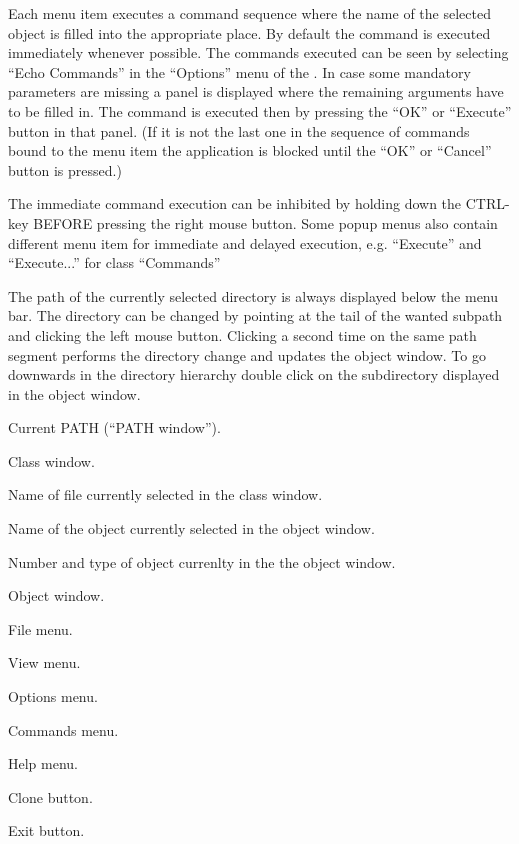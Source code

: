    Each menu item executes a command sequence where the name of the selected
   object is filled into the appropriate place.  By default the command is
   executed immediately whenever possible. The commands executed can be seen
   by selecting ``Echo Commands'' in the ``Options'' menu of the \EW.
   In case some mandatory parameters are missing a panel is displayed
   where the remaining arguments have to be filled in.  The command is
   executed then by pressing the ``OK'' or ``Execute'' button in that panel.
   (If it is not the last one in the sequence of commands bound to the menu item
   the application is blocked until the ``OK'' or ``Cancel'' button is pressed.)

   The immediate command execution can be inhibited by holding down the
   CTRL-key BEFORE pressing the right mouse button.  Some popup menus also
   contain different menu item for immediate and delayed execution, e.g.
   ``Execute'' and ``Execute...'' for class ``Commands''

   The path of the currently selected directory is always displayed below the
   menu bar.  The directory can be changed by pointing at the tail of the
   wanted subpath and clicking the left mouse button.  Clicking a second time
   on the same path segment performs the directory change and updates the
   object window.  To go downwards in the directory hierarchy double click on
   the subdirectory displayed in the object window.


\begin{EnumZB}
\item Current PATH (``PATH window'').
\item Class window.
\item Name of file currently selected in the class window.
\item Name of the object currently selected in the object window.
\item Number and type of object currenlty in the the object window.
\item Object window.
\end{EnumZB}

\begin{EnumZW}
\item File menu.
\item View menu.
\item Options menu.
\item Commands menu.
\item Help menu.
\item Clone button.
\item Exit button.
\end{EnumZW}

